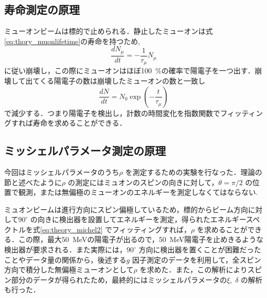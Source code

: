 \subsection{寿命測定の原理}
ミューオンビームは標的で止められる．静止したミューオンは式\eqref{eq:thory_muonlifetime}の寿命を持つため,
\begin{equation}
\frac{dN_\mu}{dt} = -\frac{1}{\tau_\mu} N_{\mu}
\end{equation}
に従い崩壊し，この際にミューオンはほぼ100~\%の確率で陽電子を一つ出す．崩壊して出てくる陽電子の数は崩壊したミューオンの数と一致し
\begin{equation}
\frac{dN}{dt} = N_0 \exp{\left(-\frac{t}{\tau_\mu}\right) }
\end{equation}
で減少する．つまり陽電子を検出し，計数の時間変化を指数関数でフィッティングすれば寿命を求めることができる．

\subsection{ミッシェルパラメータ測定の原理}
今回はミッシェルパラメータのうち$\rho$ を測定するための実験を行なった．理論の節と述べたように$\rho$ の測定にはミュオンのスピンの向きに対して，$\theta = \pi / 2$ の位置で観測，または無偏極のミューオンのエネルギーを測定しなくてはならない.

ミュオンビームは進行方向にスピン偏極しているため，標的からビーム方向に対して$90^{\circ}$ の向きに検出器を設置してエネルギーを測定，得られたエネルギースペクトルを式\eqref{eq:theory_michel2} でフィッティングすれば，$\rho$ を求めることができる．この際，最大50~MeVの陽電子が出るので，50~MeV陽電子を止めきるような検出器が要求される．また実際には，$90^{\circ}$ 方向に検出器を置くことが困難だったことやデータ量の関係から，後述する$g$ 因子測定のデータを利用して，全スピン方向で積分した無偏極ミューオンとして$\rho$ を求めた．また，この解析によりスピン部分のデータが得られたため，最終的にはミッシェルパラメータの$\xi,\;\delta$ の解析も行った．

